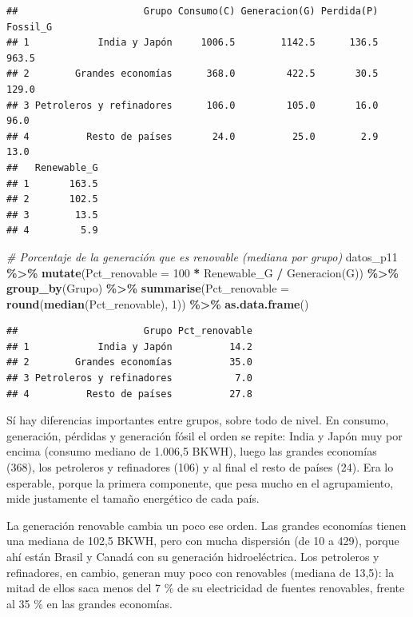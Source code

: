 \documentclass[
]{article}
\newenvironment{Shaded}{\begin{snugshade}}{\end{snugshade}}
\newcommand{\AttributeTok}[1]{\textcolor[rgb]{0.13,0.29,0.53}{#1}}
\newcommand{\CommentTok}[1]{\textcolor[rgb]{0.56,0.35,0.01}{\textit{#1}}}
\newcommand{\DecValTok}[1]{\textcolor[rgb]{0.00,0.00,0.81}{#1}}
\newcommand{\FunctionTok}[1]{\textcolor[rgb]{0.13,0.29,0.53}{\textbf{#1}}}
\newcommand{\NormalTok}[1]{#1}
\newcommand{\SpecialCharTok}[1]{\textcolor[rgb]{0.81,0.36,0.00}{\textbf{#1}}}
\newcommand{\StringTok}[1]{\textcolor[rgb]{0.31,0.60,0.02}{#1}}
\begin{document}
\begin{verbatim}
##                      Grupo Consumo(C) Generacion(G) Perdida(P) Fossil_G
## 1            India y Japón     1006.5        1142.5      136.5    963.5
## 2        Grandes economías      368.0         422.5       30.5    129.0
## 3 Petroleros y refinadores      106.0         105.0       16.0     96.0
## 4          Resto de países       24.0          25.0        2.9     13.0
##   Renewable_G
## 1       163.5
## 2       102.5
## 3        13.5
## 4         5.9
\end{verbatim}

\begin{Shaded}
\begin{Highlighting}[]
\CommentTok{\# Porcentaje de la generación que es renovable (mediana por grupo)}
\NormalTok{datos\_p11 }\SpecialCharTok{\%\textgreater{}\%}
  \FunctionTok{mutate}\NormalTok{(}\AttributeTok{Pct\_renovable =} \DecValTok{100} \SpecialCharTok{*}\NormalTok{ Renewable\_G }\SpecialCharTok{/} \StringTok{\textasciigrave{}}\AttributeTok{Generacion(G)}\StringTok{\textasciigrave{}}\NormalTok{) }\SpecialCharTok{\%\textgreater{}\%}
  \FunctionTok{group\_by}\NormalTok{(Grupo) }\SpecialCharTok{\%\textgreater{}\%}
  \FunctionTok{summarise}\NormalTok{(}\AttributeTok{Pct\_renovable =} \FunctionTok{round}\NormalTok{(}\FunctionTok{median}\NormalTok{(Pct\_renovable), }\DecValTok{1}\NormalTok{)) }\SpecialCharTok{\%\textgreater{}\%}
  \FunctionTok{as.data.frame}\NormalTok{()}
\end{Highlighting}
\end{Shaded}

\begin{verbatim}
##                      Grupo Pct_renovable
## 1            India y Japón          14.2
## 2        Grandes economías          35.0
## 3 Petroleros y refinadores           7.0
## 4          Resto de países          27.8
\end{verbatim}

Sí hay diferencias importantes entre grupos, sobre todo de nivel. En
consumo, generación, pérdidas y generación fósil el orden se repite:
India y Japón muy por encima (consumo mediano de 1.006,5 BKWH), luego
las grandes economías (368), los petroleros y refinadores (106) y al
final el resto de países (24). Era lo esperable, porque la primera
componente, que pesa mucho en el agrupamiento, mide justamente el tamaño
energético de cada país.

La generación renovable cambia un poco ese orden. Las grandes economías
tienen una mediana de 102,5 BKWH, pero con mucha dispersión (de 10 a
429), porque ahí están Brasil y Canadá con su generación hidroeléctrica.
Los petroleros y refinadores, en cambio, generan muy poco con renovables
(mediana de 13,5): la mitad de ellos saca menos del 7 \% de su
electricidad de fuentes renovables, frente al 35 \% en las grandes
economías.
\end{document}
